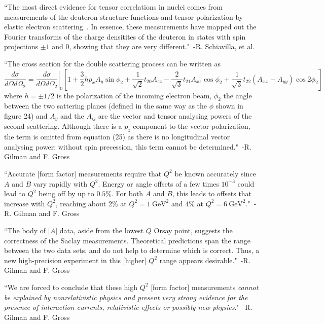 ``The most direct evidence for tensor correlations in nuclei comes from measurements of the deuteron structure functions and tensor polarization by elastic electron scattering~\cite{Gilman:2001yh}. In essence, these measurements have mapped out the Fourier transforms of the charge densitites of the deuteron in states with spin projections $\pm1$ and 0, showing that they are very different."~-R. Schiavilla, et al.~\cite{Schiavilla:2006xx}


``The cross section for the double scattering process can be written as~\cite{Arnold:1979cg}
\begin{dmath}
	\frac{d\sigma}{d\Omega d\Omega_2} = \left. \frac{d\sigma}{d\Omega d\Omega_2}\right|_0 \left[1 + \frac{3}{2}hp_xA_y\sin{\phi_2} + \frac{1}{\sqrt{2}}t_{20}A_{zz} - \frac{2}{\sqrt{3}}t_{21}A_{xz}\cos{\phi_2}+\frac{1}{\sqrt{3}}t_{22}\left( A_{xx} - A_{yy} \right) \cos{2\phi_2}  \right]
\end{dmath}
where $h=\pm 1/2$ is the polarization of the incoming electron beam, $\phi_2$ the angle between the two sattering planes (defined in the same way as the $\phi$ shown in figure 24) and $A_y$ and the $A_{ij}$ are the vector and tensor analysing powers of the second scattering. Although there is a $p_z$ component to the vector polarization, the term is omitted from equation (25) as there is no longitudinal vector analysing power; without spin precession, this term cannot be determined."~-R. Gilman and F. Gross~\cite{Gilman:2001yh}

``Accurate [form factor] measurements require that $Q^2$ be known accurately since $A$ and $B$ vary rapidly with $Q^2$. Energy or angle offsets of a few times $10^{-3}$ could lead to $Q^2$ being off by up to $0.5\%$. For both $A$ and $B$, this leads to offsets that increase with $Q^2$, reaching about 2\% at $Q^2=1\mathrm{~GeV}^2$ and 4\% at $Q^2=6\mathrm{~GeV}^2$."~-R. Gilman and F. Gross~\cite{Gilman:2001yh}

``The body of [$A$] data, aside from the lowest $Q$ Orsay point, suggests the correctness of the Saclay measurements. Theoretical predictions span the range between the two data sets, and do not help to determine which is correct. Thus, a new high-precision experiment in this [higher] $Q^2$ range appears desirable."~-R. Gilman and F. Gross~\cite{Gilman:2001yh}

``We are forced to conclude that these high $Q^2$ [form factor] measurements \emph{cannot be explained by nonrelativistic physics and present very strong evidence for the presence of interaction currents, relativistic effects or possibly new physics}."~-R. Gilman and F. Gross~\cite{Gilman:2001yh}

